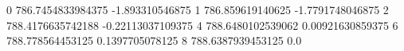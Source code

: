 0 786.7454833984375 -1.893310546875
1 786.859619140625 -1.7791748046875
2 788.4176635742188 -0.22113037109375
4 788.6480102539062 0.00921630859375
6 788.778564453125 0.1397705078125
8 788.6387939453125 0.0
